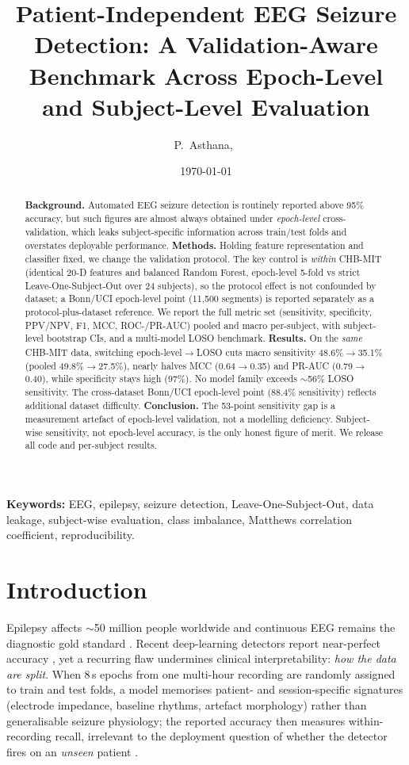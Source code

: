 \documentclass[10pt,journal,twocolumn]{IEEEtran}
\title{\textbf{Patient-Independent EEG Seizure Detection: A Validation-Aware\\
Benchmark Across Epoch-Level and Subject-Level Evaluation}}
\author{P.~Asthana,~\IEEEmembership{NeuroAI Research Group}}
\date{\today}
\begin{document}
\maketitle

\begin{abstract}
\noindent\textbf{Background.} Automated EEG seizure detection is routinely reported above 95\% accuracy, but such figures are almost always obtained under \emph{epoch-level} cross-validation, which leaks subject-specific information across train/test folds and overstates deployable performance.
\textbf{Methods.} Holding feature representation and classifier fixed, we change the validation protocol. The key control is \emph{within} CHB-MIT (identical 20-D features and balanced Random Forest, epoch-level 5-fold vs strict Leave-One-Subject-Out over 24 subjects), so the protocol effect is not confounded by dataset; a Bonn/UCI epoch-level point (11{,}500 segments) is reported separately as a protocol-plus-dataset reference. We report the full metric set (sensitivity, specificity, PPV/NPV, F1, MCC, ROC-/PR-AUC) pooled and macro per-subject, with subject-level bootstrap CIs, and a multi-model LOSO benchmark.
\textbf{Results.} On the \emph{same} CHB-MIT data, switching epoch-level$\rightarrow$LOSO cuts macro sensitivity 48.6\%$\rightarrow$35.1\% (pooled 49.8\%$\rightarrow$27.5\%), nearly halves MCC (0.64$\rightarrow$0.35) and PR-AUC (0.79$\rightarrow$0.40), while specificity stays high (97\%). No model family exceeds $\sim$56\% LOSO sensitivity. The cross-dataset Bonn/UCI epoch-level point (88.4\% sensitivity) reflects additional dataset difficulty.
\textbf{Conclusion.} The 53-point sensitivity gap is a measurement artefact of epoch-level validation, not a modelling deficiency. Subject-wise sensitivity, not epoch-level accuracy, is the only honest figure of merit. We release all code and per-subject results.
\end{abstract}

\noindent\textbf{Keywords:} EEG, epilepsy, seizure detection, Leave-One-Subject-Out, data leakage, subject-wise evaluation, class imbalance, Matthews correlation coefficient, reproducibility.

\section{Introduction}
Epilepsy affects $\sim$50 million people worldwide and continuous EEG remains the diagnostic gold standard \citep{ep241003385}. Recent deep-learning detectors report near-perfect accuracy \citep{ep250820535,ep210510358,ep251108861}, yet a recurring flaw undermines clinical interpretability: \emph{how the data are split}. When 8\,s epochs from one multi-hour recording are randomly assigned to train and test folds, a model memorises patient- and session-specific signatures (electrode impedance, baseline rhythms, artefact morphology) rather than generalisable seizure physiology; the reported accuracy then measures within-recording recall, irrelevant to the deployment question of whether the detector fires on an \emph{unseen} patient \citep{ep250515203,ep210203336}.
\end{document}
